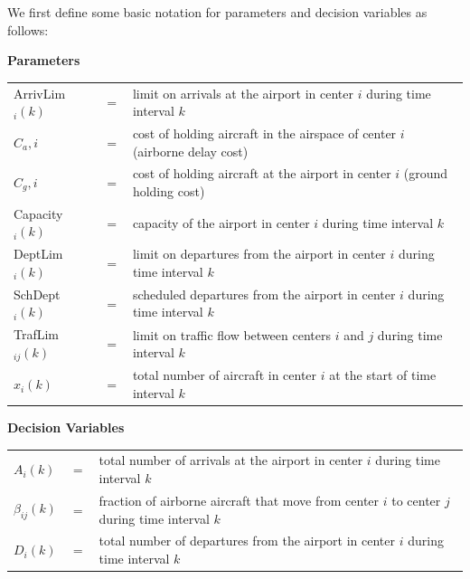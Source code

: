 \documentclass[conference]{IEEEtran}
\begin{document}
We first define some basic notation for parameters and decision variables as follows:
\vspace{-0.5mm}

\begin{center}
    \bf Parameters
\end{center}
\vspace{2mm}

\begin{tabular}{@{}p{5.5em}p{0.8em}p{16.5em}@{}} 
  ArrivLim$_i(k)$ & $=$ & limit on arrivals at the airport in center $i$ during time interval $k$ \\
  $C_a,i$ & $=$ & cost of holding aircraft in the airspace of center $i$ (airborne delay cost) \\
  $C_g,i$ & $=$ & cost of holding aircraft at the airport in center $i$ (ground holding cost) \\
  Capacity$_i(k)$ & $=$ & capacity of the airport in center $i$ during time interval $k$ \\
  DeptLim$_i(k)$ & $=$ & limit on departures from the airport in center $i$ during time interval $k$ \\
  SchDept$_i(k)$ & $=$ & scheduled departures from the airport in center $i$ during time interval $k$ \\
  TrafLim$_{ij}(k)$ & $=$ & limit on traffic flow between centers $i$ and $j$ during time interval $k$ \\
  $x_i(k)$ & $=$ & total number of aircraft in center $i$ at the start of time interval $k$ \\
\end{tabular}
\vspace{-0.5mm}

\begin{center}
    \bf Decision Variables
\end{center}
\vspace{2mm}

\begin{tabular}{@{}p{5.5em}p{0.8em}p{16.5em}@{}} 
  $A_i(k)$ & $=$ & total number of arrivals at the airport in center $i$ during time interval $k$ \\
  $\beta_{ij}(k)$ & $=$ & fraction of airborne aircraft that move from center $i$ to center $j$ during time interval $k$ \\
  $D_i(k)$ & $=$ & total number of departures from the airport in center $i$ during time interval $k$ \\
\end{tabular}
\vspace{2mm}
\end{document}
